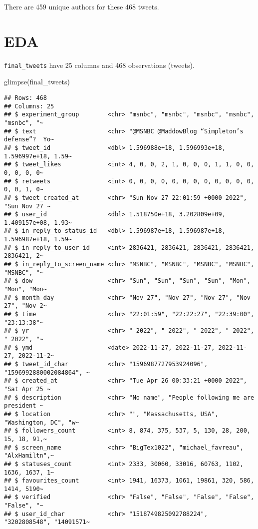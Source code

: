 \documentclass[
]{article}
\newenvironment{Shaded}{\begin{snugshade}}{\end{snugshade}}
\newcommand{\FunctionTok}[1]{\textcolor[rgb]{0.00,0.00,0.00}{#1}}
\newcommand{\NormalTok}[1]{#1}
\begin{document}
There are 459 unique authors for these 468 tweets.

\newpage

\hypertarget{eda}{%
\section{EDA}\label{eda}}

\texttt{final\_tweets} have 25 columns and 468 observations (tweets).

\begin{Shaded}
\begin{Highlighting}[]
\FunctionTok{glimpse}\NormalTok{(final\_tweets)}
\end{Highlighting}
\end{Shaded}

\begin{verbatim}
## Rows: 468
## Columns: 25
## $ experiment_group        <chr> "msnbc", "msnbc", "msnbc", "msnbc", "msnbc", "~
## $ text                    <chr> "@MSNBC @MaddowBlog “Simpleton’s defense”?  Yo~
## $ tweet_id                <dbl> 1.596988e+18, 1.596993e+18, 1.596997e+18, 1.59~
## $ tweet_likes             <int> 4, 0, 0, 2, 1, 0, 0, 0, 1, 1, 0, 0, 0, 0, 0, 0~
## $ retweets                <int> 0, 0, 0, 0, 0, 0, 0, 0, 0, 0, 0, 0, 0, 0, 1, 0~
## $ tweet_created_at        <chr> "Sun Nov 27 22:01:59 +0000 2022", "Sun Nov 27 ~
## $ user_id                 <dbl> 1.518750e+18, 3.202809e+09, 1.409157e+08, 1.93~
## $ in_reply_to_status_id   <dbl> 1.596987e+18, 1.596987e+18, 1.596987e+18, 1.59~
## $ in_reply_to_user_id     <int> 2836421, 2836421, 2836421, 2836421, 2836421, 2~
## $ in_reply_to_screen_name <chr> "MSNBC", "MSNBC", "MSNBC", "MSNBC", "MSNBC", "~
## $ dow                     <chr> "Sun", "Sun", "Sun", "Sun", "Mon", "Mon", "Mon~
## $ month_day               <chr> "Nov 27", "Nov 27", "Nov 27", "Nov 27", "Nov 2~
## $ time                    <chr> "22:01:59", "22:22:27", "22:39:00", "23:13:38"~
## $ yr                      <chr> " 2022", " 2022", " 2022", " 2022", " 2022", "~
## $ ymd                     <date> 2022-11-27, 2022-11-27, 2022-11-27, 2022-11-2~
## $ tweet_id_char           <chr> "1596987727953924096", "1596992880002084864", ~
## $ created_at              <chr> "Tue Apr 26 00:33:21 +0000 2022", "Sat Apr 25 ~
## $ description             <chr> "No name", "People following me are president ~
## $ location                <chr> "", "Massachusetts, USA", "Washington, DC", "w~
## $ followers_count         <int> 8, 874, 375, 537, 5, 130, 28, 200, 15, 18, 91,~
## $ screen_name             <chr> "BigTex1022", "michael_favreau", "AlxHamiltn",~
## $ statuses_count          <int> 2333, 30060, 33016, 60763, 1102, 1636, 1637, 1~
## $ favourites_count        <int> 1941, 16373, 1061, 19861, 320, 586, 1414, 5190~
## $ verified                <chr> "False", "False", "False", "False", "False", "~
## $ user_id_char            <chr> "1518749825092788224", "3202808548", "14091571~
\end{verbatim}
\end{document}
